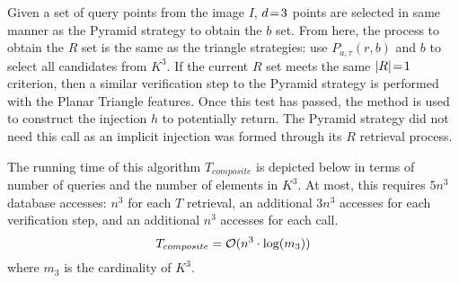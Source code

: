 Given a set of query points from the image $I$, $d \!=\! 3$ points are selected in same manner as the Pyramid strategy
to obtain the $b$ set.
From here, the process to obtain the $R$ set is the same as the triangle strategies: use $P_{a, \tau}(r, b)$ and $b$ to
select all candidates from $K^3$.
If the current $R$ set meets the same $\left| R \right| \!=\! 1$ criterion, then a similar verification step to the Pyramid
strategy is performed with the Planar Triangle features.
Once this test has passed, the  method is used to construct the injection $h$ to potentially return.
The Pyramid strategy did not need this call as an implicit injection was formed through its $R$ retrieval process.

The running time of this algorithm $T_{composite}$ is depicted below in terms of number of queries and the number
of elements in $K^3$.
At most, this requires $5n^3$ database accesses: $n^3$ for each $T$ retrieval, an additional $3n^3$ accesses for each
verification step, and an additional $n^3$ accesses for each  call.
\begin{equation}
    T_{composite} = \mathcal{O} (n^3 \cdot \log(m_3))
\end{equation}
where $m_3$ is the cardinality of $K^3$.


%    
